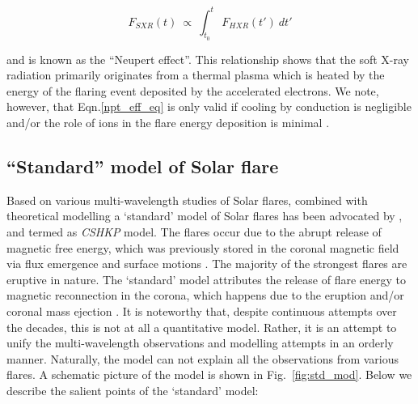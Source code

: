 \begin{equation}\label{npt_eff_eq}
    F_{SXR}(t)~\propto~\int_{t_{0}}^{t}~F_{HXR}(t')~dt'
\end{equation}

\noindent and is known as the ``Neupert effect''. This relationship shows that the soft X-ray radiation primarily originates from a thermal plasma which is heated by the energy of the flaring event deposited by the accelerated electrons. We note, however, that Eqn.\ref{npt_eff_eq} is only valid if cooling by conduction is negligible and/or the role of ions in the flare energy deposition is minimal \citep{veronig05}.

\subsection{``Standard'' model of Solar flare}\label{sol_flr_std_mod}

Based on various multi-wavelength studies of Solar flares, combined with theoretical modelling a `standard' model of Solar flares has been advocated by \cite{carmichael64,sturrock66,hirayama74,kopp76}, and termed as \textsl{CSHKP} model. The flares occur due to the abrupt release of magnetic free energy, which was previously stored in the coronal magnetic field via flux emergence and surface motions \citep{forbes06}. The majority of the strongest flares are eruptive in nature. The `standard' model attributes the release of flare energy to magnetic reconnection in the corona, which happens due to the eruption and/or coronal mass ejection \citep{shibata95,lin_n_forbes00,moore01,priest_n_forbes02}. It is noteworthy that, despite continuous attempts over the decades, this is not at all a quantitative model. Rather, it is an attempt to unify the multi-wavelength observations and modelling attempts in an orderly manner. Naturally, the model can not explain all the observations from various flares. A schematic picture of the model is shown in Fig.~\ref{fig:std_mod}. Below we describe the salient points of the `standard' model:

